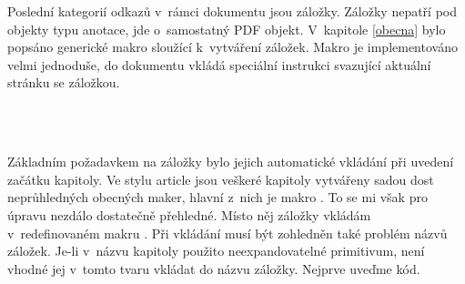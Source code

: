 \documentclass[12pt]{article}
\begin{document}
\medskip
Poslední kategorií odkazů v~rámci dokumentu jsou záložky. Záložky nepatří pod
objekty typu anotace, jde o~samostatný PDF objekt. V~kapitole \ref{obecna}
bylo popsáno generické makro  sloužící k~vytváření záložek.
Makro je implementováno velmi jednoduše, do dokumentu vkládá speciální 
instrukci svazující aktuální stránku se záložkou.
\begin{flushleft}
   \\
   \\
\end{flushleft}
Základním požadavkem na záložky bylo jejich automatické vkládání při uvedení
začátku kapitoly. Ve stylu \textsf{article} jsou veškeré kapitoly vytvářeny
sadou dost neprůhledných obecných maker, hlavní z~nich je makro 
. To se mi však pro úpravu nezdálo dostatečně
přehledné. Místo něj záložky vkládám v~redefinovaném makru 
.
Při vkládání musí být zohledněn také problém názvů záložek. Je-li v~názvu
kapitoly použito neexpandovatelné primitivum, není vhodné jej v~tomto tvaru
vkládat do názvu záložky. Nejprve uveďme kód.
\begin{flushleft}
   \\
   \\[4pt]
   \\
   \\
   \\
  \\
\end{flushleft}
\end{document}
